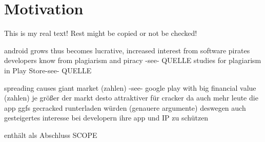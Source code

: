 \section{Motivation}\label{section:introduction-motivation}
This is my real text! Rest might be copied or not be checked!

%
android grows thus becomes lucrative, increased interest from software pirates
developers know from plagiarism and piracy -see- QUELLE
studies for plagiarism in Play Store-see- QUELLE
\cite{munteanLicense}
%

spreading causes giant market (zahlen) -see- google play with big financial value (zahlen)\newline
je größer der markt desto attraktiver für cracker da auch mehr leute die app ggfs gecracked runterladen würden (genauere argumente)\newline
deswegen auch gesteigertes interesse bei developern ihre app und IP zu schützen\newline

enthält als Abschluss SCOPE\newline
